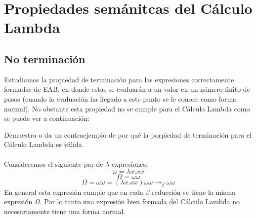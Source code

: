         \section{Propiedades semánitcas del Cálculo Lambda}

                \subsection{No terminación}
                    Estudiamos la propiedad de terminación para las expresiones correctamente formadas de \textsf{EAB}, en donde estas se evaluarán a un valor en un número finito de pasos (cuando la evaluación ha llegado a este punto se le conoce como forma normal). 
                    No obstante esta propiedad no se cumple para el Cálculo Lambda como se puede ver a continuación:
                    \begin{exercise}
                        Demuestra o da un contraejemplo de por qué la porpiedad de terminación para el Cálculo Lambda es válida.\\\\
                        Consideremos el siguiente par de $\lambda$-expresiones:\\
                        $$ \omega = \lambda x.xx$$
                        $$ \Omega = \omega \omega$$
                        $$ \Omega = \omega \omega = (\lambda x.xx) \omega \omega \rightarrow_\beta \omega \omega$$
                        En general esta expresión cumple que en cada $\beta$-reducción se tiene la misma expresión $\Omega$.
                        Por lo tanto una expresión bien formada del Cálculo Lambda no necesariamente tiene una forma normal.
                    \end{exercise}

